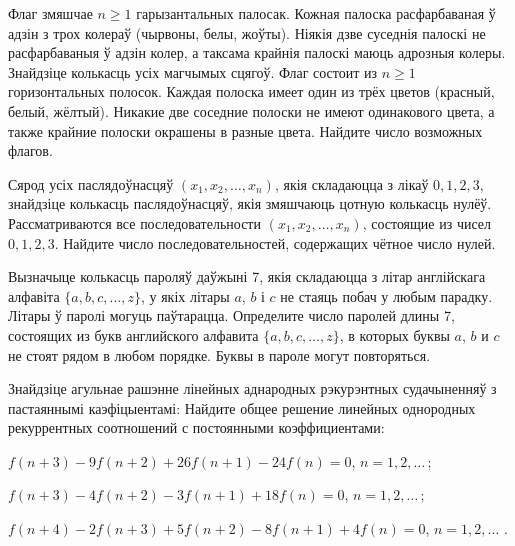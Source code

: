 \begin{problemList}
\problemItemSimple
{Флаг змяшчае $n \ge 1$ гарызантальных палосак. Кожная палоска расфарбаваная ў адзін з трох колераў (чырвоны, белы, жоўты).
Ніякія дзве суседнія палоскі не расфарбаваныя ў адзін колер, а таксама крайнія палоскі маюць адрозныя колеры.
Знайдзіце колькасць усіх магчымых сцягоў.}
{Флаг состоит из $n \ge 1$ горизонтальных полосок. Каждая полоска
имеет один из трёх цветов (красный, белый, жёлтый). Никакие две соседние полоски
не имеют одинакового цвета, а также крайние полоски окрашены в разные цвета.
Найдите число возможных флагов.}

\bigskip

\problemItemSimple
{Сярод усіх паслядоўнасцяў $(x_1, x_2, \ldots, x_n)$, якія складаюцца з лікаў
$0, 1, 2, 3$, знайдзіце колькасць паслядоўнасцяў, якія змяшчаюць цотную колькасць нулёў.}
{Рассматриваются все последовательности $(x_1, x_2, \ldots, x_n)$,
состоящие из чисел $0, 1, 2, 3$. Найдите число последовательностей,
содержащих чётное число нулей.}

\bigskip

\problemItemSimple
{Вызначыце колькасць пароляў даўжыні 7, якія складаюцца з літар англійскага алфавіта
$\{a, b, c, \ldots, z\}$, у якіх літары $a$, $b$ і $c$ не стаяць побач у любым парадку.
Літары ў паролі могуць паўтарацца.}
{Определите число паролей длины 7, состоящих из букв английского
алфавита $\{a, b, c, \ldots, z\}$, в которых буквы $a$, $b$ и $c$ не
стоят рядом в любом порядке. Буквы в пароле могут повторяться.}

\bigskip

\problemItemWithCommonPart
{Знайдзіце агульнае рашэнне лінейных аднародных рэкурэнтных судачыненняў з пастаяннымі каэфіцыентамі:}
{Найдите общее решение линейных однородных рекуррентных соотношений с
постоянными коэффициентами:}
{\begin{belarusianEnumerate}
  \item $f(n + 3) - 9f(n + 2) + 26f(n + 1) - 24f(n) = 0$, $n = 1, 2, \ldots\, $;
  \item $f(n + 3) - 4f(n + 2) - 3f(n + 1) + 18f(n) = 0$, $n = 1, 2, \ldots\, $;
  \item $f(n + 4) - 2f(n + 3) + 5f(n + 2) - 8f(n + 1) + 4f(n) = 0$, $n = 1, 2, \ldots\,\, $.
\end{belarusianEnumerate}}

\end{problemList}


